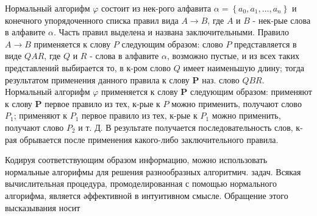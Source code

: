 \documentclass[10pt]{article}
\begin{document}
Нормальный алгорифм $\varphi$ состоит из нек-рого алфавита $\alpha=\left\{a_{0}, a_{1}, \ldots, a_{n}\right\}$ и конечного упорядоченного списка правил вида $A \rightarrow B$, где $A$ и $B$ - нек-рые слова в алфавите $\alpha$. Часть правил выделена и названа заключительными. Правило $A \rightarrow B$ применяется к слову $P$ следующим образом: слово $P$ представляется в виде $Q A R$, где $Q$ и $R$ - слова в алфавите $\alpha$, возможно пустые, и из всех таких представлений выбирается то, в к-ром слово $Q$ имеет наименьшую длину; тогда результатом применения данного правила к слову $\boldsymbol{P}$ наз. слово $Q B R$. Нормальный алгорифм $\varphi$ применяется к слову $\boldsymbol{P}$ следующим образом: применяют к слову $\boldsymbol{P}$ первое правило из тех, к-рые к $P$ можно применить, получают слово $P_{1}$; применяют к $P_{1}$ первое правило из тех, к-рые к $P_{1}$ можно применить, получают слово $P_{2}$ и т. Д. В результате получается последовательность слов, к-рая обрывается после применения какого-либо заключительного правила.



Кодируя соответствующим образом информацию, можно использовать нормальные алгорифмы для решения разнообразных алгоритмич. задач. Всякая вычислительная процедура, промоделированная с помощью нормального алгорифма, является әффективной в интуитивном смысле. Обращение этого высказывания носит
\end{document}
